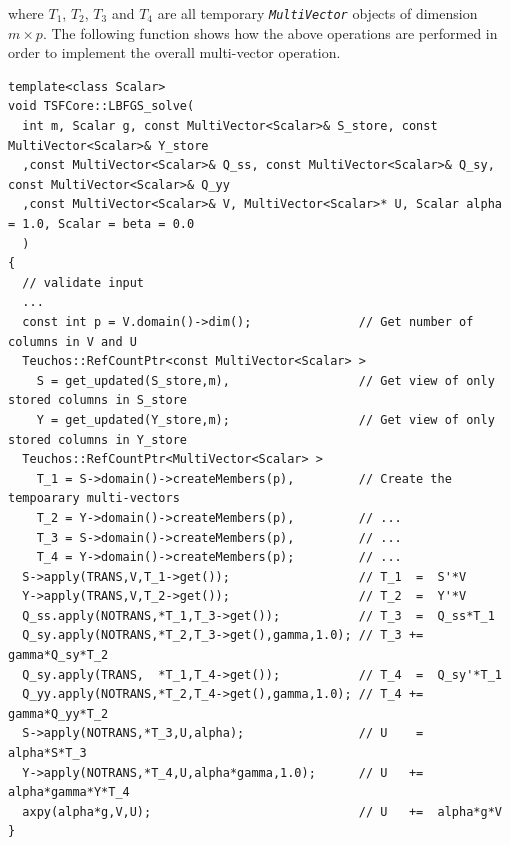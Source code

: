 {}\noindent{}where $T_1$, $T_2$, $T_3$ and $T_4$ are all temporary
{}\texttt{\textit{Multi\-Vector}} objects of dimension $m \times p$.
The following function shows how the above operations are performed in
order to implement the overall multi-vector operation.

{\scriptsize\begin{verbatim}
template<class Scalar>
void TSFCore::LBFGS_solve(
  int m, Scalar g, const MultiVector<Scalar>& S_store, const MultiVector<Scalar>& Y_store
  ,const MultiVector<Scalar>& Q_ss, const MultiVector<Scalar>& Q_sy, const MultiVector<Scalar>& Q_yy
  ,const MultiVector<Scalar>& V, MultiVector<Scalar>* U, Scalar alpha = 1.0, Scalar = beta = 0.0
  )
{
  // validate input
  ...
  const int p = V.domain()->dim();               // Get number of columns in V and U
  Teuchos::RefCountPtr<const MultiVector<Scalar> >
    S = get_updated(S_store,m),                  // Get view of only stored columns in S_store
    Y = get_updated(Y_store,m);                  // Get view of only stored columns in Y_store
  Teuchos::RefCountPtr<MultiVector<Scalar> >
    T_1 = S->domain()->createMembers(p),         // Create the tempoarary multi-vectors
    T_2 = Y->domain()->createMembers(p),         // ...
    T_3 = S->domain()->createMembers(p),         // ...
    T_4 = Y->domain()->createMembers(p);         // ...
  S->apply(TRANS,V,T_1->get());                  // T_1  =  S'*V
  Y->apply(TRANS,V,T_2->get());                  // T_2  =  Y'*V
  Q_ss.apply(NOTRANS,*T_1,T_3->get());           // T_3  =  Q_ss*T_1
  Q_sy.apply(NOTRANS,*T_2,T_3->get(),gamma,1.0); // T_3 +=  gamma*Q_sy*T_2
  Q_sy.apply(TRANS,  *T_1,T_4->get());           // T_4  =  Q_sy'*T_1
  Q_yy.apply(NOTRANS,*T_2,T_4->get(),gamma,1.0); // T_4 +=  gamma*Q_yy*T_2
  S->apply(NOTRANS,*T_3,U,alpha);                // U    =  alpha*S*T_3
  Y->apply(NOTRANS,*T_4,U,alpha*gamma,1.0);      // U   +=  alpha*gamma*Y*T_4
  axpy(alpha*g,V,U);                             // U   +=  alpha*g*V
}
\end{verbatim}}

